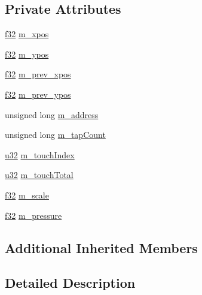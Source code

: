 \subsection*{Private Attributes}
\begin{DoxyCompactItemize}
\item 
\mbox{\hyperlink{_util_8h_a5f6906312a689f27d70e9d086649d3fd}{f32}} \mbox{\hyperlink{classnjli_1_1_device_touch_aa459469f52287f2085402117c13512f8}{m\+\_\+xpos}}
\item 
\mbox{\hyperlink{_util_8h_a5f6906312a689f27d70e9d086649d3fd}{f32}} \mbox{\hyperlink{classnjli_1_1_device_touch_aec3c40c2adb1ba1bf5a13bf366bd3b6d}{m\+\_\+ypos}}
\item 
\mbox{\hyperlink{_util_8h_a5f6906312a689f27d70e9d086649d3fd}{f32}} \mbox{\hyperlink{classnjli_1_1_device_touch_aefd5c83cec6edc7dcb7edeec2144c470}{m\+\_\+prev\+\_\+xpos}}
\item 
\mbox{\hyperlink{_util_8h_a5f6906312a689f27d70e9d086649d3fd}{f32}} \mbox{\hyperlink{classnjli_1_1_device_touch_adc6f1bce3fa81e81f1a01ca55b2b3db7}{m\+\_\+prev\+\_\+ypos}}
\item 
unsigned long \mbox{\hyperlink{classnjli_1_1_device_touch_adf8b9a7a96b90d0639aca0b9982a95d7}{m\+\_\+address}}
\item 
unsigned long \mbox{\hyperlink{classnjli_1_1_device_touch_af4506b66dcc8e44597244c9a6827bd0d}{m\+\_\+tap\+Count}}
\item 
\mbox{\hyperlink{_util_8h_a10e94b422ef0c20dcdec20d31a1f5049}{u32}} \mbox{\hyperlink{classnjli_1_1_device_touch_a8702a0eb417f912b2b8733b2f21a8060}{m\+\_\+touch\+Index}}
\item 
\mbox{\hyperlink{_util_8h_a10e94b422ef0c20dcdec20d31a1f5049}{u32}} \mbox{\hyperlink{classnjli_1_1_device_touch_ad36aeb2b221ff37cf29d6b5f837d0d93}{m\+\_\+touch\+Total}}
\item 
\mbox{\hyperlink{_util_8h_a5f6906312a689f27d70e9d086649d3fd}{f32}} \mbox{\hyperlink{classnjli_1_1_device_touch_ae07cde00eac9eb6e816f261bdb0df9d4}{m\+\_\+scale}}
\item 
\mbox{\hyperlink{_util_8h_a5f6906312a689f27d70e9d086649d3fd}{f32}} \mbox{\hyperlink{classnjli_1_1_device_touch_a1fbc998f1460afc213b0ba31410599bd}{m\+\_\+pressure}}
\end{DoxyCompactItemize}
\subsection*{Additional Inherited Members}


\subsection{Detailed Description}


